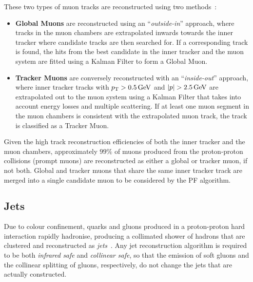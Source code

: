 These two types of muon tracks are reconstructed using two methods~\cite{Chatrchyan:2012xi}:
\begin{itemize}
\item \textbf{Global Muons} are reconstructed using an ``\emph{outside-in}'' approach, where tracks in the muon chambers are extrapolated inwards towards the inner tracker where candidate tracks are then searched for.
If a corresponding track is found, the hits from the best candidate in the inner tracker and the muon system are fitted using a Kalman Filter to form a Global Muon.
\item \textbf{Tracker Muons} are conversely reconstructed with an ``\emph{inside-out}'' approach, where inner tracker tracks with $p_{\mathrm{T}} > 0.5\,\text{Ge\hspace{-.08em}V}$ and $|p| > 2.5\,\text{Ge\hspace{-.08em}V}$ are extrapolated out to the muon system using a Kalman Filter that takes into account energy losses and multiple scattering.
If at least one muon segment in the muon chambers is consistent with the extrapolated muon track, the track is classified as a Tracker Muon.
\end{itemize}

Given the high track reconstruction efficiencies of both the inner tracker and the muon chambers, approximately $99\%$ of muons produced from the proton-proton collisions (prompt muons) are reconstructed as either a global or tracker muon, if not both.
Global and tracker muons that share the same inner tracker track are merged into a single candidate muon to be considered by the PF algorithm.

%

\subsection{Jets}\label{subsec:objReco-jets}
Due to colour confinement, quarks and gluons produced in a proton-proton hard interaction rapidly hadronise, producing a collimated shower of hadrons that are clustered and reconstructed as \emph{jets}~\cite{Salam:2009jx}.
Any jet reconstruction algorithm is required to be both \emph{infrared safe} and \emph{collinear safe}, \ie so that the emission of soft gluons and the collinear splitting of gluons, respectively, do not change the jets that are actually constructed.

